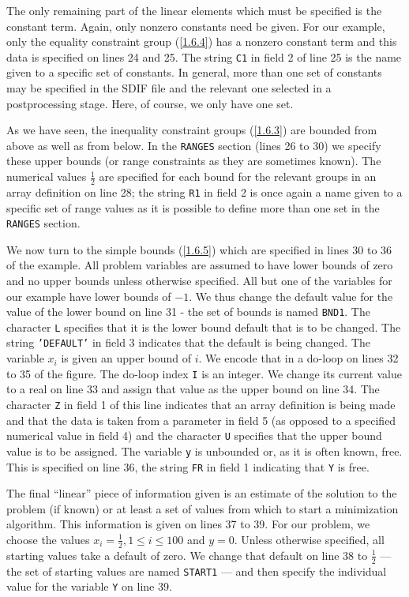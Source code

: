 \documentclass[a4paper]{article}
\newcommand{\req}[1]{(\ref{#1})}
\newcommand{\sfrac}[2]{{\scriptstyle \frac{#1}{#2}}}
\newcommand{\half}{\sfrac{1}{2}}
\begin{document}
The only remaining part of the linear elements
which must be specified
is the constant term. Again, only nonzero constants need be given. For
our  example, only  the  equality constraint
group
\req{1.6.4} has a
nonzero constant term and  this data is specified on  lines 24 and 25.
The string  {\tt C1} in  field 2 of  line 25 is  the   name given to a
specific set of constants. In general,  more  than one set of constants
may be specified in  the SDIF file and the  relevant one selected in a
postprocessing stage. Here, of course, we only have one set.

As   we have seen, the  inequality   constraint groups \req{1.6.3} are
bounded from above as well as from  below. In the {\tt RANGES}
section (lines 26 to  30)  we  specify  these  upper bounds (or  range
constraints  as  they are  sometimes  known).
The  numerical  values
$\half$ are specified for each bound  for the relevant groups
in an array
definition on line 28; the string {\tt R1} in field 2 is once
again a name
given to a specific set of range values as it is possible
to define more than one set in the {\tt RANGES} section.

We now turn to the simple  bounds
\req{1.6.5} which are  specified in
lines 30 to 36 of the example.   All problem variables  are assumed to
have  lower  bounds  of zero and   no upper  bounds  unless  otherwise
specified.  All but one  of the variables  for our  example have lower
bounds of $-1$. We  thus change the default
value for the value of the lower bound on line 31 - the set of bounds
is named {\tt BND1}.  The  character {\tt L}
specifies that  it is the lower  bound
default that  is to be changed.
The string {\tt 'DEFAULT'}
in field 3 indicates that the default is  being changed.  The variable
$x_i$ is given an upper bound
of $i$. We encode  that in a do-loop on
lines  32 to  35 of  the figure.  The  do-loop  index {\tt I}   is  an
integer.  We change its current value to a real on line 33  and assign
that value  as the upper bound
on  line 34.  The  character {\tt Z} in
field 1 of this line indicates that an  array
definition is being made
and that the data is taken from a parameter in field 5 (as  opposed to
a specified numerical   value in field   4) and the character  {\tt U}
specifies that the upper bound
value is to  be assigned.  The variable
{\tt y} is unbounded  or,  as   it  is   often known,  free.
This  is specified on line 36, the  string {\tt FR}
in field  1 indicating that {\tt Y} is free.

The final ``linear'' piece of information given is an estimate  of the
solution to the problem (if known) or  at  least a set of  values from
which to start a minimization  algorithm. This information is given on
lines  37  to  39. For  our problem,   we  choose  the  values  $x_i =
\half,  1  \leq  i  \leq  100$ and  $y   = 0$.  Unless otherwise
specified, all starting values take a default of zero.
We change that
default on line 38 to $\half$ --- the set of starting values are
named  {\tt START1} ---  and then specify the individual  value for the
variable {\tt Y} on line 39.
\end{document}
